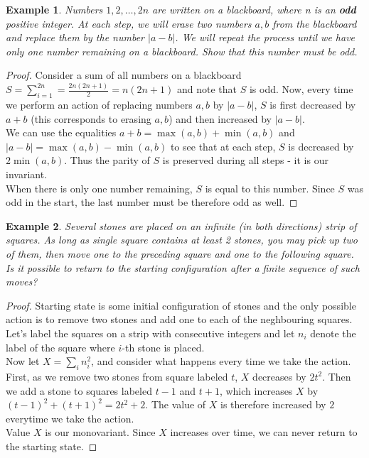 \documentclass[11pt,a5paper]{article}
\newtheorem{theorem}{Example}
\begin{document}
\begin{theorem}
Numbers $1,2,\dots,2n$ are written on a blackboard, where n is an \textbf{odd} positive integer. At each step, we will erase two numbers $a, b$ from the blackboard and replace them by the number $|a - b|$. We will repeat the process until we have only one number remaining on a blackboard. Show that this number must be odd.
\end{theorem}
\begin{proof}
Consider a sum of all numbers on a blackboard \\ $S = \sum_{i = 1}^{2n} = \frac{2n(2n+1)}{2} = n(2n + 1)$ and note that $S$ is odd. Now, every time we perform an action of replacing numbers $a, b$ by $|a - b|$, $S$ is first decreased by $a + b$ (this corresponds to erasing $a, b$) and then increased by $|a - b|$.\\
We can use the equalities $a + b = \max{(a,b)} + \min{(a,b)}$ and $|a - b| = \max{(a,b)} - \min{(a,b)}$ to see that at each step, $S$ is decreased by $2\min{(a,b)}$. Thus the parity of $S$ is preserved during all steps - it is our invariant. \\
When there is only one number remaining, $S$ is equal to this number. Since $S$ was odd in the start, the last number must be therefore odd as well. 

\end{proof}

\begin{theorem}
	Several stones are placed on an infinite (in both directions) strip of squares. As long as single square contains at least 2 stones, you may pick up two of them, then move one to the preceding square and one to the following square. Is it possible to return to the starting configuration after a finite sequence of such moves?
\end{theorem}
\begin{proof}
	Starting state is some initial configuration of stones and the only possible action is to remove two stones and add one to each of the neghbouring squares.\\
Let's label the squares on a strip with consecutive integers and let $n_i$ denote the label of the square where $i$-th stone is placed.\\ 
Now let $X = \sum_{i}{n_i^2}$, and consider what happens every time we take the action. First, as we remove two stones from square labeled $t$, $X$ decreases by $2t^2$. Then we add a stone to squares labeled $t-1$ and $t+1$, which increases $X$ by $(t-1)^2 + (t+1)^2 = 2t^2 + 2$. The value of $X$ is therefore increased by $2$ everytime we take the action. \\
Value $X$ is our monovariant. Since $X$ increases over time, we can never return to the starting state.
\end{proof}
\end{document}
